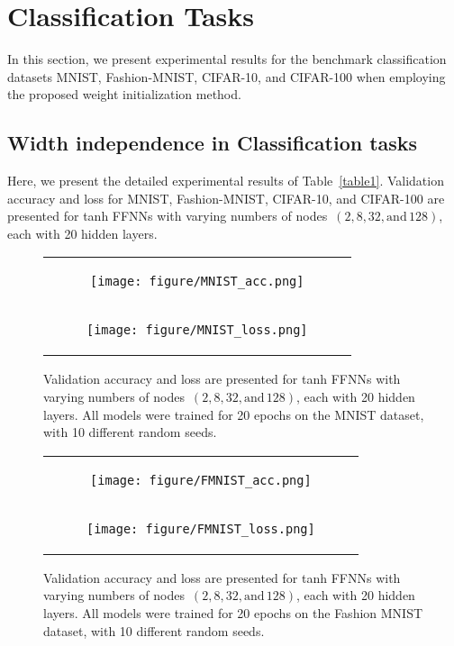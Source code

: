 \documentclass{article} \usepackage{iclr2025_conference,times}
\begin{document}
\section{Classification Tasks}
In this section, we present experimental results for the benchmark classification datasets MNIST, Fashion-MNIST, CIFAR-10, and CIFAR-100 when employing the proposed weight initialization method.

\subsection{Width independence in Classification tasks}\label{app2}
Here, we present the detailed experimental results of Table~\ref{table1}. 
Validation accuracy and loss for MNIST, Fashion-MNIST, CIFAR-10, and CIFAR-100 are presented for tanh FFNNs with varying numbers of nodes~$(2, 8, 32, \text{and}\, 128)$, each with 20 hidden layers.


\begin{figure}[h!]
\centering 
\begin{tabular}{c}
\begin{subfigure}[b]{0.97\textwidth}
    \centering
    \texttt{[image: figure/MNIST\_acc.png]}
\end{subfigure} \\
\begin{subfigure}[b]{0.97\textwidth}
    \centering
    \texttt{[image: figure/MNIST\_loss.png]}

\end{subfigure} 
\end{tabular}
\caption{Validation accuracy and loss are presented for tanh FFNNs with varying numbers of nodes~$(2, 8, 32, \text{and}\,128)$, each with 20 hidden layers. All models were trained for 20 epochs on the MNIST dataset, with 10 different random seeds.}
\end{figure}


\begin{figure}[h!]
\centering 
\begin{tabular}{c}
\begin{subfigure}[b]{0.97\textwidth}
    \centering
    \texttt{[image: figure/FMNIST\_acc.png]}
\end{subfigure} \\
\begin{subfigure}[b]{0.97\textwidth}
    \centering
    \texttt{[image: figure/FMNIST\_loss.png]}
\end{subfigure} 
\end{tabular}
\caption{Validation accuracy and loss are presented for tanh FFNNs with varying numbers of nodes~$(2, 8, 32, \text{and}\,128)$, each with 20 hidden layers. All models were trained for 20 epochs on the Fashion MNIST dataset, with 10 different random seeds.}
\end{figure}
\end{document}
